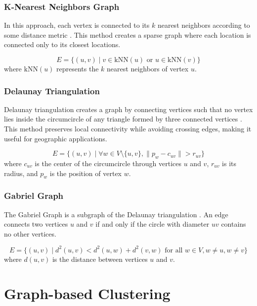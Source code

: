 \subsubsection{K-Nearest Neighbors Graph}
In this approach, each vertex is connected to its $k$ nearest neighbors according to some distance metric . This method creates a sparse graph where each location is connected only to its closest locations.

\begin{equation}
    E = \{(u, v) \mid v \in \text{kNN}(u) \text{ or } u \in \text{kNN}(v)\}
\end{equation}
where $\text{kNN}(u)$ represents the $k$ nearest neighbors of vertex $u$.

\subsubsection{Delaunay Triangulation}
Delaunay triangulation creates a graph by connecting vertices such that no vertex lies inside the circumcircle of any triangle formed by three connected vertices . This method preserves local connectivity while avoiding crossing edges, making it useful for geographic applications.

\begin{equation}
    E = \{(u, v) \mid \forall w \in V \setminus \{u, v\}, \|p_w - c_{uv}\| > r_{uv} \}
\end{equation}
where $c_{uv}$ is the center of the circumcircle through vertices $u$ and $v$, $r_{uv}$ is its radius, and $p_w$ is the position of vertex $w$.

\subsubsection{Gabriel Graph}
The Gabriel Graph is a subgraph of the Delaunay triangulation . An edge connects two vertices $u$ and $v$ if and only if the circle with diameter $uv$ contains no other vertices.

\begin{equation}
    E = \{(u, v) \mid d^2(u, v) < d^2(u, w) + d^2(v, w) \text{ for all } w \in V, w \neq u, w \neq v\}
\end{equation}
where $d(u, v)$ is the distance between vertices $u$ and $v$.

\section{Graph-based Clustering}
\label{se:GraphBasedClusterings}

